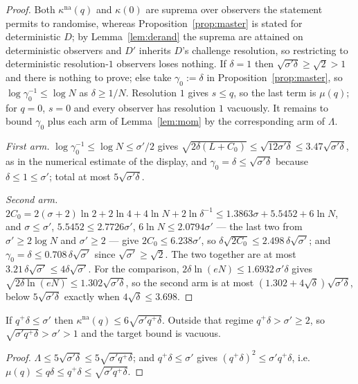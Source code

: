 \documentclass{aicr-solution}
\newcommand{\kna}{\kappa^{\mathrm{na}}}
\begin{document}
\begin{proof}
Both $\kna(q)$ and $\kappa(0)$ are suprema over observers the statement permits
to randomise, whereas Proposition~\ref{prop:master} is stated for deterministic
$D$; by Lemma~\ref{lem:derand} the suprema are attained on deterministic
observers and $D'$ inherits $D$'s challenge resolution, so restricting to
deterministic resolution-$1$ observers loses nothing. If $\delta=1$ then
$\sqrt{\sigma'\delta}\ge\sqrt2>1$ and there is nothing to prove; else take
$\gamma_0:=\delta$ in Proposition~\ref{prop:master}, so $\log\gamma_0^{-1}\le\log N$
as $\delta\ge1/N$. Resolution $1$ gives $s\le q$, so the last term is $\mu(q)$;
for $q=0$, $s=0$ and every observer has resolution $1$ vacuously. It remains to
bound $\gamma_0$ plus each arm of Lemma~\ref{lem:mom} by the corresponding arm of
$\Lambda$.

\emph{First arm.} $\log\gamma_0^{-1}\le\log N\le\sigma'/2$ gives
$\sqrt{2\delta(L+C_0)}\le\sqrt{12\sigma'\delta}\le3.47\sqrt{\sigma'\delta}$, as in
the numerical estimate of the display, and
$\gamma_0=\delta\le\sqrt{\sigma'\delta}$ because $\delta\le1\le\sigma'$; total at
most $5\sqrt{\sigma'\delta}$.

\emph{Second arm.} $2C_0=2(\sigma+2)\ln2+2\ln4+4\ln N+2\ln\delta^{-1}
\le1.3863\sigma+5.5452+6\ln N$, and $\sigma\le\sigma'$, $5.5452\le2.7726\sigma'$,
$6\ln N\le2.0794\sigma'$ --- the last two from $\sigma'\ge2\log N$ and
$\sigma'\ge2$ --- give $2C_0\le6.238\sigma'$, so
$\delta\sqrt{2C_0}\le2.498\,\delta\sqrt{\sigma'}$; and
$\gamma_0=\delta\le0.708\,\delta\sqrt{\sigma'}$ since $\sqrt{\sigma'}\ge\sqrt2$.
The two together are at most $3.21\,\delta\sqrt{\sigma'}\le4\delta\sqrt{\sigma'}$.
For the comparison, $2\delta\ln(eN)\le1.6932\,\sigma'\delta$ gives
$\sqrt{2\delta\ln(eN)}\le1.302\sqrt{\sigma'\delta}$, so the second arm is at most
$(1.302+4\sqrt\delta)\sqrt{\sigma'\delta}$, below $5\sqrt{\sigma'\delta}$ exactly
when $4\sqrt\delta\le3.698$.
\end{proof}

\begin{corollary}\label{cor:A}
If $q^{+}\delta\le\sigma'$ then $\kna(q)\le6\sqrt{\sigma'q^{+}\delta}$. Outside
that regime $q^{+}\delta>\sigma'\ge2$, so $\sqrt{\sigma'q^{+}\delta}>\sigma'>1$
and the target bound is vacuous.
\end{corollary}

\begin{proof}
$\Lambda\le5\sqrt{\sigma'\delta}\le5\sqrt{\sigma'q^{+}\delta}$; and
$q^{+}\delta\le\sigma'$ gives $(q^{+}\delta)^{2}\le\sigma'q^{+}\delta$, i.e.
$\mu(q)\le q\delta\le q^{+}\delta\le\sqrt{\sigma'q^{+}\delta}$.
\end{proof}
\end{document}
